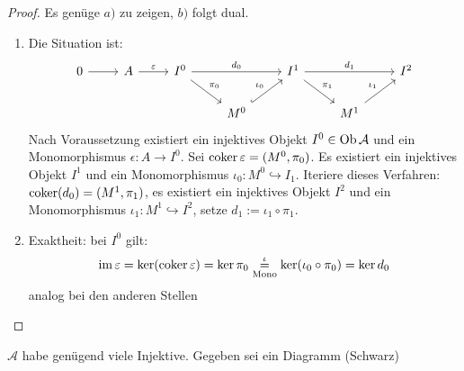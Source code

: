 \begin{proof}
	Es genüge $a)$ zu zeigen, $b)$ folgt dual.
	\begin{enumerate}
		\item Die Situation ist:
		$$\begin{tikzcd}
		0 \arrow{r} & A \arrow{r}{\epsilon}& I^0 \arrow{dr}{\pi_0} \arrow{rr}{d_0} & & I^1\arrow{dr}{\pi_1} \arrow{rr}{d_1} & & I^2 \\
		& & & M^0 \arrow[hook]{ur}{\iota_0} & & M^1 \arrow{ur}{\iota_1}  &		
		\end{tikzcd}$$
		Nach Voraussetzung existiert ein injektives Objekt $I^0 \in \text{Ob}\,\mathcal{A}$ und ein Monomorphismus $\epsilon:A \to I^0$. Sei $\operatorname{coker} \varepsilon= (M^0, \pi_0)$. Es existiert ein injektives Objekt $I^1$ und ein Monomorphismus $\iota_0:M^0 \hookrightarrow I_1$. Iteriere dieses Verfahren: $\operatorname{coker}(d_0) = (M^1, \pi_1)$, es existiert ein injektives Objekt $I^2$ und ein Monomorphismus $\iota_1:M^1\hookrightarrow I^2$, setze $d_1:= \iota_1 \circ \pi_1$.
		\item Exaktheit: bei $I^0$ gilt:
		$$\operatorname{im} \varepsilon = \ker (\operatorname{coker} \varepsilon) = \ker \pi_0 \underset{\text{Mono}}{\overset{\iota}{=}} \ker (\iota_0 \circ \pi_0) = \ker d_0$$
		analog bei den anderen Stellen
	\end{enumerate}
\end{proof}
\begin{sa}[Hufeisenlemma]
	$\mathcal{A}$ habe genügend viele Injektive. Gegeben sei ein Diagramm (Schwarz)
\end{sa}